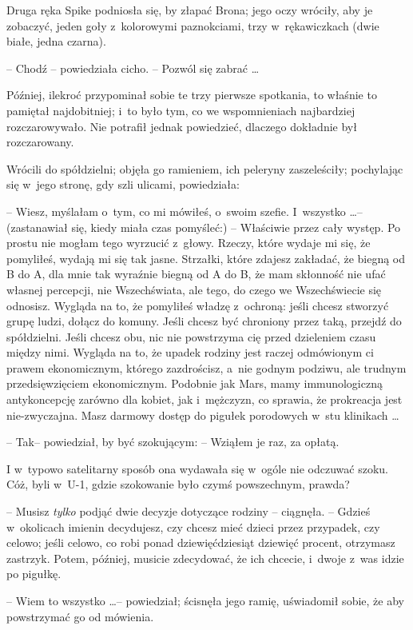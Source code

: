 \documentclass[oneside,polish,11pt,rmheadings]{mwbk}
\begin{document}
Druga ręka Spike podniosła się, by złapać Brona; jego oczy wróciły, aby je zobaczyć, jeden goły z~kolorowymi paznokciami, trzy w~rękawiczkach (dwie białe, jedna czarna). 

-- Chodź -- powiedziała cicho. -- Pozwól się zabrać \ldots  

Później, ilekroć przypominał sobie te trzy pierwsze spotkania, to właśnie to pamiętał najdobitniej; i~to było tym, co we wspomnieniach najbardziej rozczarowywało. Nie potrafił jednak powiedzieć, dlaczego dokładnie był rozczarowany. 

Wrócili do spółdzielni; objęła go ramieniem, ich peleryny zaszeleściły; pochylając się w~jego stronę, gdy szli ulicami, powiedziała: 

-- Wiesz, myślałam o~tym, co mi mówiłeś, o~swoim szefie. I~wszystko \ldots  -- (zastanawiał się, kiedy miała czas pomyśleć:) -- Właściwie przez cały występ. Po prostu nie mogłam tego wyrzucić z~głowy. Rzeczy, które wydaje mi się, że pomyliłeś, wydają mi się tak jasne. Strzałki, które zdajesz zakładać, że biegną od B do A, dla mnie tak wyraźnie biegną od A do B, że mam skłonność nie ufać własnej percepcji, nie Wszechświata, ale tego, do czego we Wszechświecie się odnosisz. Wygląda na to, że pomyliłeś władzę z~ochroną: jeśli chcesz stworzyć grupę ludzi, dołącz do komuny. Jeśli chcesz być chroniony przez taką, przejdź do spółdzielni. Jeśli chcesz obu, nic nie powstrzyma cię przed dzieleniem czasu między nimi. Wygląda na to, że upadek rodziny jest raczej odmówionym ci prawem ekonomicznym, którego zazdrościsz, a~nie godnym podziwu, ale trudnym przedsięwzięciem ekonomicznym. Podobnie jak Mars, mamy immunologiczną antykoncepcję zarówno dla kobiet, jak i~mężczyzn, co sprawia, że prokreacja jest nie-zwyczajna. Masz darmowy dostęp do pigułek porodowych w~stu klinikach \ldots  

-- Tak-- powiedział, by być szokującym: -- Wziąłem je raz, za opłatą. 

I w~typowo satelitarny sposób ona wydawała się w~ogóle nie odczuwać szoku. Cóż, byli w~U-1, gdzie szokowanie było czymś powszechnym, prawda? 

-- Musisz \textit{tylko }podjąć dwie decyzje dotyczące rodziny -- ciągnęła. -- Gdzieś w~okolicach imienin decydujesz, czy chcesz mieć dzieci przez przypadek, czy celowo; jeśli celowo, co robi ponad dziewięćdziesiąt dziewięć procent, otrzymasz zastrzyk. Potem, później, musicie zdecydować, że ich chcecie, i~dwoje z~was idzie po pigułkę. 

-- Wiem to wszystko \ldots  -- powiedział; ścisnęła jego ramię, uświadomił sobie, że aby powstrzymać go od mówienia. 
\end{document}
